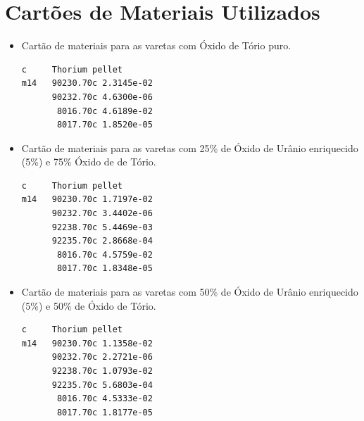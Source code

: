 \documentclass[
	12pt,				%
	openany,			%
	twoside,			%
	a4paper,			%
	english,			%
	french,				%
	spanish,			%
	brazil				%
	]{abntex2}
\begin{document}
\begin{anexosenv}
\begin{itemize}
\begin{lstlisting}
\end{lstlisting}
\end{itemize}
\chapter{Cartões de Materiais Utilizados}
\begin{itemize}
\item Cartão de materiais para as varetas com Óxido de Tório puro.
\begin{lstlisting}
c     Thorium pellet 
m14   90230.70c 2.3145e-02 
      90232.70c 4.6300e-06
       8016.70c 4.6189e-02
       8017.70c 1.8520e-05 
\end{lstlisting}

\item Cartão de materiais para as varetas com 25\% de Óxido de Urânio enriquecido (5\%) e 75\% Óxido de de Tório.
\begin{lstlisting}
c     Thorium pellet 
m14   90230.70c 1.7197e-02 
      90232.70c 3.4402e-06
      92238.70c 5.4469e-03 
      92235.70c 2.8668e-04
       8016.70c 4.5759e-02 
       8017.70c 1.8348e-05 
\end{lstlisting}

\item Cartão de materiais para as varetas com 50\% de Óxido de Urânio enriquecido (5\%) e 50\% de Óxido de Tório.
\begin{lstlisting}
c     Thorium pellet 
m14   90230.70c 1.1358e-02 
      90232.70c 2.2721e-06
      92238.70c 1.0793e-02 
      92235.70c 5.6803e-04
       8016.70c 4.5333e-02 
       8017.70c 1.8177e-05  
\end{lstlisting}
\end{itemize}

\end{anexosenv}
\end{document}
